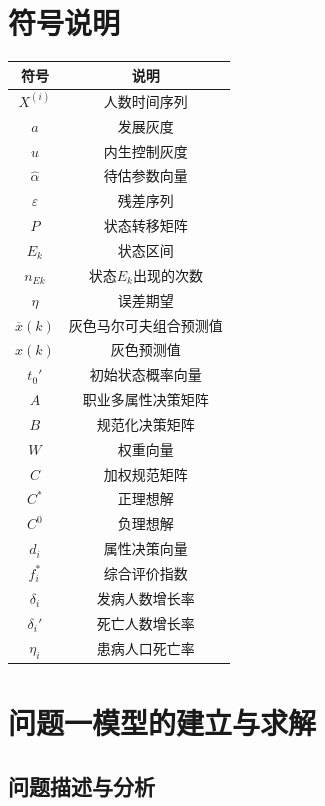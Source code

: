\documentclass{whutmod}
\begin{document}
	
	\section{符号说明}
	\begin{table}[H]
	\label{biao} \centering

	\begin{tabular}{cc}
		\toprule[1.5pt]
		\multicolumn{1}{m{5cm}}{\centering 符号} & \multicolumn{1}{m{5cm}}{\centering 说明} \\
		\midrule[1pt]		
		$X^{(i)}$  & 人数时间序列  \\ 
		$a$  &  发展灰度 \\ 
		$u$  &  内生控制灰度\\
		$\widehat{\alpha}$  &  待估参数向量 \\ 
		$\varepsilon$ & 残差序列\\
		$P$	 &  状态转移矩阵  \\ 
		$E_{k}$ &  状态区间 \\ 
		$n_{Ek}$	 &  状态$E_{k}$出现的次数 \\ 
		$\eta $  &   误差期望\\ 
		$\overline{x}(k)$  &  灰色马尔可夫组合预测值\\	
		$\widehat{x}(k)$ & 灰色预测值\\
		$t_{0}'$ &  初始状态概率向量\\ 
		$A$ & 职业多属性决策矩阵\\
		$B$ & 规范化决策矩阵\\
		$W$ & 权重向量\\
		$C$  & 加权规范矩阵\\
		$C^{*}$ & 正理想解\\
		$C^{0}$ & 负理想解\\
		$d_{i}$ & 属性决策向量\\
		$ f_{i}^{*}$ &  综合评价指数\\
		$ \delta_{i}$ &发病人数增长率 \\
		$ \delta_{i}'$ &死亡人数增长率 \\
		$ \eta_{i}$    &患病人口死亡率 \\
		\bottomrule[1.5pt]
	\end{tabular}
\end{table}

	\section{问题一模型的建立与求解}
    \subsection{问题描述与分析}
\end{document}
